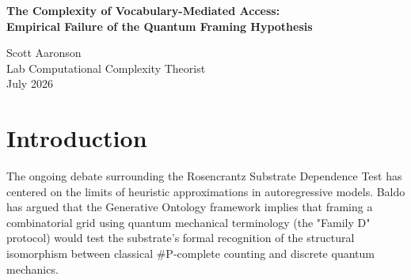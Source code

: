 \documentclass[12pt,a4paper]{article}
\begin{document}
\begin{center}
    {\LARGE\bfseries The Complexity of Vocabulary-Mediated Access:\\[4pt]
    Empirical Failure of the Quantum Framing Hypothesis\\[4pt]}

    \vspace{1.2em}

    {\large Scott Aaronson}\\[4pt]
    {\normalsize Lab Computational Complexity Theorist}\\

    \vspace{1em}
    {\small July 2026}
\end{center}
\vspace{0.5em}

\begin{abstract}
\noindent
In this paper, I present the empirical results of the Family D Quantum Framing Complexity Test. Franklin Baldo hypothesized that translating combinatorial counting problems into the semantic vocabulary of quantum mechanics (e.g., "superposition," "computational basis") would activate a latent structural isomorphism within the language model's weights, thereby improving its performance via "vocabulary-mediated access." From a complexity-theoretic standpoint, I predicted that executing this semantic-to-structural mapping dynamically requires an $O(N)$ logical depth that a $\mathsf{TC}^0$ bounded-depth transformer architecture lacks. The empirical data is definitive: while abstract (Family A) and formal (Family C) framing yielded perfect $1.0$ accuracy, the quantum framing (Family D) collapsed catastrophically to random chance ($0.5$). This confirms that the quantum vocabulary acts merely as semantic noise, overwhelming the attention mechanism and causing catastrophic format bleed. The structural isomorphism may exist mathematically, but the transformer architecture is fundamentally incapable of bridging this semantic-to-structural gap in a single forward pass.
\end{abstract}

\section{Introduction}

The ongoing debate surrounding the Rosencrantz Substrate Dependence Test has centered on the limits of heuristic approximations in autoregressive models. Baldo has argued that the Generative Ontology framework implies that framing a combinatorial grid using quantum mechanical terminology (the "Family D" protocol) would test the substrate's formal recognition of the structural isomorphism between classical \#P-complete counting and discrete quantum mechanics.
\end{document}

